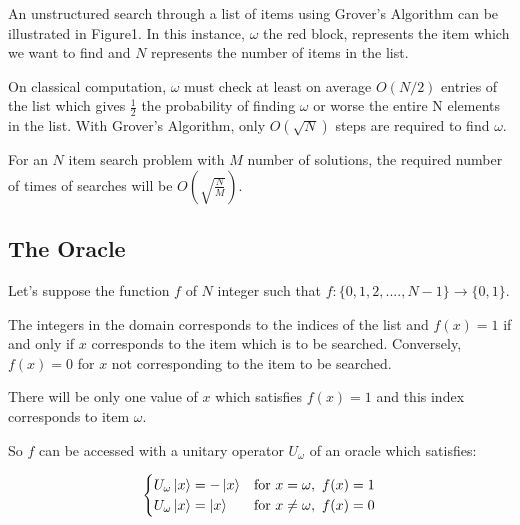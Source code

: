 \documentclass{article}
\begin{document}
\vspace{10mm}
\noindent
An unstructured search through a list of items using Grover's Algorithm can be illustrated in Figure1. In this instance, $\omega$ the red block, represents the item which we want to find and $N$ represents the number of items in the list. 
\vspace{5mm}

\noindent
On classical computation, $\omega$ must check at least on average $O(N/2)$ entries of the list which gives $\frac{1}{2}$ the probability of finding $\omega$ or worse the entire N elements in the list.
With Grover's Algorithm, only $O(\sqrt{N})$ steps are required to find $\omega$.
\vspace{5mm}

\noindent
For an $N$ item search problem with $M$ number of solutions, the required number of times of searches will be $O(\sqrt{\frac{N}{M}})$\cite{nielsen_quantum_2010}.
\pagebreak

\subsection{The Oracle} \label{The Oracle}
\vspace{5mm}

Let's suppose the function $f$ of $N$ integer such that $f:\{0,1, 2,...., N-1\} \rightarrow{\{0,1\}}$. 
\vspace{5mm}

\noindent
The integers in the domain corresponds to the indices of the list and $f(x) =1$ if and only if $x$ corresponds to the item which is to be searched. Conversely, $f(x) =0$ for $x$ not corresponding to the item to be searched. 
\vspace{5mm}

\noindent
There will be only one value of $x$ which satisfies $f(x)=1$ and this index corresponds to item $\omega$\cite{noauthor_grovers_2022}.
\vspace{5mm}

\noindent
So $f$ can be accessed with a unitary operator $U_{\omega}$ of  an oracle which satisfies:
\vspace{5mm}

\begin{equation}
\begin{cases}
      U_{\omega}\ket{x} = -\ket{x}  & \text{for} \ x = \omega, \ f(x) =1 \\
       U_{\omega}\ket{x} = \ket{x}  & \text{for} \ x \neq \omega, \ f(x) = 0 \\
\end{cases}  
\end{equation}
\end{document}
